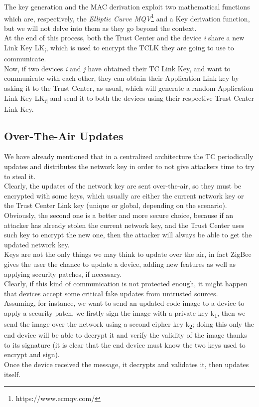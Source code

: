 \documentclass[12pt]{report}
\begin{document}
{The key generation and the MAC derivation exploit two mathematical functions which are, respectively, the \emph{Elliptic Curve MQV}\footnote{https://www.ecmqv.com/} and a Key derivation function, but we will not delve into them as they go beyond the context.\\
At the end of this process, both the Trust Center and the device \emph{i} share a new Link Key LK\textsubscript{i}, which is used to encrypt the TCLK they are going to use to communicate.\\
Now, if two devices \emph{i} and \emph{j} have obtained their TC Link Key, and want to communicate with each other, they can obtain their Application Link key by asking it to the Trust Center, as usual, which will generate a random Application Link Key LK\textsubscript{ij} and send it to both the devices using their respective Trust Center Link Key.\\

\subsection{Over-The-Air Updates}
\bigskip
We have already mentioned that in a centralized architecture the TC periodically updates and distributes the network key in order to not give attackers time to try to steal it.\\
Clearly, the updates of the network key are sent over-the-air, so they must be encrypted with some keys, which usually are either the current network key or the Trust Center Link key (unique or global, depending on the scenario).\\
Obviously, the second one is a better and more secure choice, because if an attacker has already stolen the current network key, and the Trust Center uses such key to encrypt the new one, then the attacker will always be able to get the updated network key.\\

Keys are not the only things we may think to update over the air, in fact ZigBee gives the user the chance to update a device, adding new features as well as applying security patches, if necessary.\\
Clearly, if this kind of communication is not protected enough, it might happen that devices accept some critical fake updates from untrusted sources.\\
Assuming, for instance, we want to send an updated code image to a device to apply a security patch, we firstly sign the image with a private key k\textsubscript{1}, then we send the image over the network using a second cipher key k\textsubscript{2}; doing this only the end device will be able to decrypt it and verify the validity of the image thanks to its signature (it is clear that the end device must know the two keys used to encrypt and sign).\\
Once the device received the message, it decrypts and validates it, then updates itself.\\

}
\end{document}
